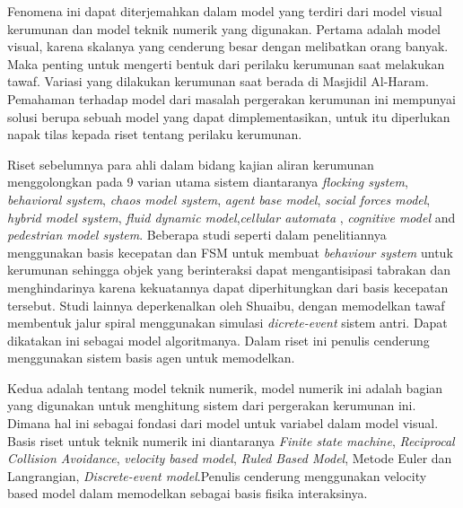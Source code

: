 \hspace{0.6cm}Fenomena ini dapat diterjemahkan dalam model yang terdiri dari model visual kerumunan dan model teknik numerik yang digunakan. Pertama adalah model visual, karena skalanya yang cenderung besar dengan melibatkan orang banyak. Maka penting untuk mengerti bentuk dari perilaku kerumunan saat melakukan tawaf. Variasi yang dilakukan kerumunan saat berada di Masjidil Al-Haram. Pemahaman terhadap model dari masalah pergerakan kerumunan ini mempunyai solusi berupa sebuah model yang dapat dimplementasikan, untuk itu diperlukan napak tilas kepada riset tentang perilaku kerumunan. 

\hspace{0.6cm}Riset sebelumnya para ahli dalam bidang kajian aliran kerumunan menggolongkan pada 9 varian utama sistem diantaranya \emph{flocking system}, \emph{behavioral system}, \emph{chaos model system}\citep{Saiwaki1997}, \emph{agent base model}\citep{Khan2012}, \emph{social forces model}\citep{Zainuddin2009}, \emph{hybrid model system}\citep{Shuaibu2015}, \emph{fluid dynamic model}\citep{Narain2009},\emph{cellular automata} \citep{Lim2012}, \emph{cognitive model}\citep{Mulyana2010} and \emph{pedestrian model system}\citep{Adnan2013}. Beberapa studi seperti \citep{Kim2014} dalam penelitiannya menggunakan basis kecepatan dan FSM untuk membuat \emph{behaviour system} untuk kerumunan sehingga objek yang berinteraksi dapat mengantisipasi tabrakan dan menghindarinya karena kekuatannya dapat diperhitungkan dari basis kecepatan tersebut\citep{Kim2014}. Studi lainnya deperkenalkan oleh Shuaibu, dengan memodelkan tawaf membentuk jalur spiral menggunakan simulasi \emph{dicrete-event} sistem antri\citep{Shuaibu2015}. Dapat dikatakan ini sebagai model algoritmanya. Dalam riset ini penulis cenderung menggunakan sistem basis agen untuk memodelkan.

\hspace{0.6cm}Kedua adalah tentang model teknik numerik, model numerik ini adalah bagian yang digunakan untuk menghitung sistem dari pergerakan kerumunan ini. 
Dimana hal ini sebagai fondasi dari model untuk variabel dalam model visual. Basis riset untuk teknik numerik ini diantaranya \emph{Finite state machine}\citep{Curtis2011}\citep{Bicho2012},  \emph{Reciprocal Collision Avoidance}, \emph{velocity based model}\citep{Kim2014}, \emph{Ruled Based Model}, Metode Euler dan Langrangian\citep{Narain2009}, \emph{Discrete-event model}.Penulis cenderung menggunakan velocity based model dalam memodelkan sebagai basis fisika interaksinya. %

